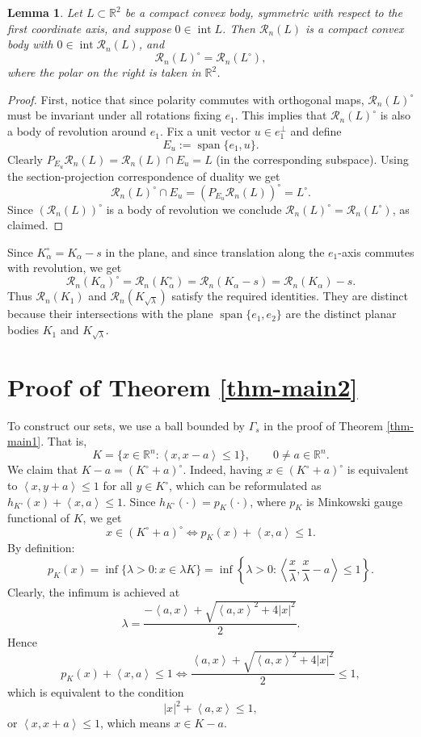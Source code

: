 \documentclass[12pt]{article}
\newtheorem{lemma}[theorem]{Lemma}
\theoremstyle{remark}
\newcommand{\R}{\mathbb R}
\newcommand{\ip}[2]{\left\langle #1,#2\right\rangle}
\newcommand{\intt}{\operatorname{int}}
\begin{document}
\begin{lemma}\label{prop:polar-revolution}
Let \(L\subset\R^2\) be a compact convex body, symmetric with respect to the first
coordinate axis, and suppose \(0\in\intt L\).  Then \(\mathcal R_n(L)\) is a
compact convex body with \(0\in\intt\mathcal R_n(L)\), and
\begin{equation}\label{eq:polar-revolution}
        \mathcal R_n(L)^\circ=\mathcal R_n(L^\circ),
\end{equation}
where the polar on the right is taken in \(\R^2\).
\end{lemma}

\begin{proof}
First, notice that since polarity commutes with orthogonal maps, $\mathcal R_n(L)^\circ$ must be invariant under all rotations fixing $e_1$. This implies that $\mathcal R_n(L)^\circ$ is also a body of revolution around $e_1$.
Fix a unit vector
\(u \in e_1^\perp\) and define
\[
        E_u:=\operatorname{span}\{e_1,u\}.
\]
Clearly $P_{E_u} \mathcal R_n(L) = \mathcal R_n(L)\cap E_u = L$ (in the corresponding subspace). Using the section-projection correspondence of duality we get
\[
\mathcal R_n(L)^\circ \cap E_u = \left(P_{E_u} \mathcal R_n(L)\right)^\circ = L^\circ.
\]
Since $\left(\mathcal R_n(L)\right)^\circ$ is a body of revolution we conclude \(\mathcal R_n(L)^\circ=\mathcal R_n(L^\circ)\), as claimed.
\end{proof}

Since \(K_\alpha^\circ=K_\alpha-s\) in the plane, and since translation along
     the
 \(e_1\)-axis commutes with revolution, we get
 \[
 \mathcal R_n(K_\alpha)^\circ
 =
 \mathcal R_n(K_\alpha^\circ)
 =
 \mathcal R_n(K_\alpha-s)
 =
 \mathcal R_n(K_\alpha)-s.
 \]
 Thus \(\mathcal R_n(K_1)\) and \(\mathcal R_n(K_{\sqrt\lambda})\) satisfy the
 required identities. They are distinct because their intersections with the
plane \(\operatorname{span}\{e_1,e_2\}\) are the distinct planar
     bodies
 \(K_1\) and \(K_{\sqrt\lambda}\).

\section{Proof of Theorem \ref{thm-main2}}
To construct our sets, we use a ball bounded by $\Gamma_s$ in the proof of Theorem \ref{thm-main1}. That is,
\[
K = \{x \in \R^n : \ip{x}{x-a} \leq 1\}, \qquad 0\neq a \in \R^n.
\]
We claim that $K - a = (K^\circ + a)^\circ$. Indeed, having $x\in (K^\circ + a)^\circ$ is equivalent to $\ip{x}{y+a} \leq 1$ for all $y\in K^\circ$, which can be reformulated as $h_{K^\circ}(x) + \ip{x}{a} \leq 1$. Since $h_{K^\circ}(\cdot) = p_K(\cdot)$, where $p_K$ is Minkowski gauge functional of $K$, we get
\[
x\in (K^\circ + a)^\circ \iff p_K(x) + \ip{x}{a} \leq 1.
\]
By definition: 
\[
p_K(x) = \inf\{\lambda > 0 : x \in \lambda K\} = \inf\left\{\lambda > 0 : \ip{\frac{x}{\lambda}}{\frac{x}{\lambda} - a} \leq 1\right\}.
\]
Clearly, the infimum is achieved at 
\[
\lambda = \frac{-\ip{a}{x}+\sqrt{\ip{a}{x}^2 + 4|x|^2}}{2}.
\]
Hence
\[
p_K(x) + \ip{x}{a} \leq 1 \iff \frac{\ip{a}{x}+\sqrt{\ip{a}{x}^2 + 4|x|^2}}{2} \leq 1,
\]
which is equivalent to the condition
\[
|x|^2 + \ip{a}{x} \leq 1,
\]
or $\ip{x}{x+a} \leq 1$, which means $x \in K-a$.
\end{document}
